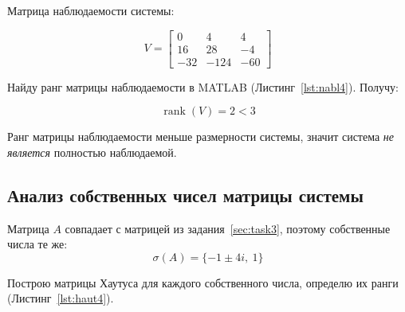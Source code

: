 \documentclass[a4paper,12pt]{article}
\begin{document}
	Матрица наблюдаемости системы:
	
	\[
	V =
	\begin{bmatrix}
		0 & 4 & 4 \\
		16 & 28 & -4 \\
		-32 & -124 & -60
	\end{bmatrix}
	\]
	
	Найду ранг матрицы наблюдаемости в MATLAB (Листинг~\ref{lst:nabl4}). Получу:
	
	\[\operatorname{rank}(V) = 2 < 3\]
	
	Ранг матрицы наблюдаемости меньше размерности системы, значит система \textit{не является} полностью наблюдаемой.
	
	
	\subsection{Анализ собственных чисел матрицы системы}
	
	Матрица $A$ совпадает с матрицей из задания~\ref{sec:task3}, поэтому собственные числа
	те же:
	\[
	\sigma(A) = \{-1 \pm 4i, \ 1\}
	\]
	
	Построю матрицы Хаутуса для каждого собственного числа, определю их ранги
	(Листинг~\ref{lst:haut4}).
	
\end{document}
